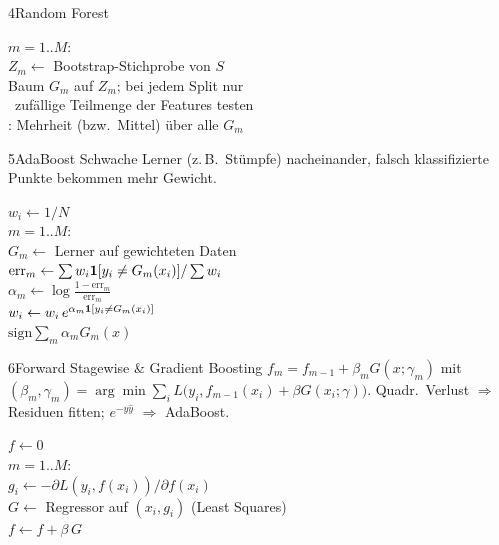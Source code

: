 \begin{hngrid}
\begin{hnp}[raster multicolumn=3,acc=hnnavy]{4}{Random Forest}
\begin{pcode}
 $m=1..M$:\\
\hii $Z_m\leftarrow$ Bootstrap-Stichprobe von $S$\\
\hii Baum $G_m$ auf $Z_m$; bei jedem Split nur\\
\hii \ zufällige Teilmenge der Features testen\\
: Mehrheit (bzw.\ Mittel) über alle $G_m$
\end{pcode}
\end{hnp}
%
\begin{hnp}[raster multicolumn=3,acc=hngreen]{5}{AdaBoost}
Schwache Lerner (z.\,B.\ Stümpfe) nacheinander, falsch klassifizierte Punkte bekommen mehr Gewicht.
\begin{pcode}[AdaBoost]
$w_i\leftarrow1/N$\\
 $m=1..M$:\\
\hii $G_m\leftarrow$ Lerner auf gewichteten Daten\\
\hii $\mathrm{err}_m\leftarrow\sum w_i\mathbf{1}[y_i\ne G_m(x_i)]/\sum w_i$\\
\hii $\alpha_m\leftarrow\log\frac{1-\mathrm{err}_m}{\mathrm{err}_m}$\\
\hii $w_i\leftarrow w_i\,e^{\alpha_m\mathbf{1}[y_i\ne G_m(x_i)]}$\\
 $\mathrm{sign}\sum_m\alpha_mG_m(x)$
\end{pcode}
\end{hnp}
%
\begin{hnp}[raster multicolumn=3,acc=hnrose]{6}{Forward Stagewise \& Gradient Boosting}
$f_m=f_{m-1}+\beta_mG(x;\gamma_m)$ mit $(\beta_m,\gamma_m)=\arg\min\sum_iL\bigl(y_i,f_{m-1}(x_i)+\beta G(x_i;\gamma)\bigr)$. 
Quadr.\ Verlust $\Rightarrow$ Residuen fitten; $e^{-y\hat y}$ $\Rightarrow$ AdaBoost.
\begin{pcode}
$f\leftarrow0$\\
 $m=1..M$:\\
\hii $g_i\leftarrow-\partial L(y_i,f(x_i))/\partial f(x_i)$\\
\hii $G\leftarrow$ Regressor auf $(x_i,g_i)$ (Least Squares)\\
\hii $f\leftarrow f+\beta\,G$
\end{pcode}
\end{hnp}

\end{hngrid}
